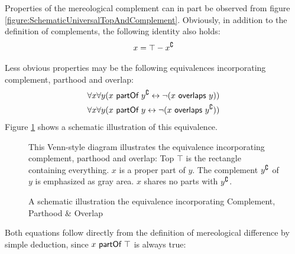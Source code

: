 Properties of the mereological complement can in part be observed from figure \ref{figure:SchematicUniversalTopAndComplement}.
Obviously, in addition to the definition of complements, the following identity also holds:
\begin{align}
x = \top - x^{\complement}
\end{align}

Less obvious properties may be the following equivalences incorporating complement, parthood and overlap:
\begin{align}
\begin{split}
\forall x \forall y
(x ~\textsf{partOf}~ y^{\complement} \leftrightarrow \neg(x ~\textsf{overlaps}~ y))
\\
\forall x \forall y
(x ~\textsf{partOf}~ y \leftrightarrow \neg(x ~\textsf{overlaps}~ y^{\complement}))
\end{split}
\end{align}
Figure \ref{figure:SchematicEquivalenceOfCopmlementParthoodAndOverlap} shows a schematic illustration of this equivalence.
\begin{figure}[h!]
\begin{center}
\end{center}
{
\scriptsize 
This Venn-style diagram illustrates the equivalence incorporating complement, parthood and overlap:
Top $\top$ is the rectangle containing everything.
$x$ is a proper part of $y$.
The complement $y^{\complement}$ of $y$ is emphasized as gray area.
$x$ shares no parts with $y^{\complement}$.
}
\caption{A schematic illustration the equivalence incorporating Complement, Parthood \& Overlap}
\label{figure:SchematicEquivalenceOfCopmlementParthoodAndOverlap}
\end{figure}
Both equations follow directly from the definition of mereological difference by simple deduction, since $x ~\textsf{partOf}~ \top$ is always true:
